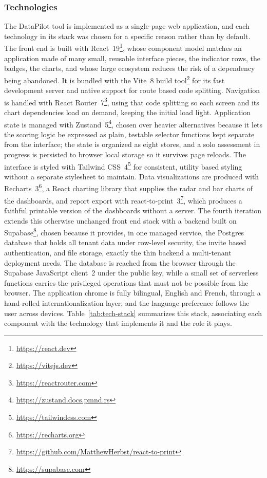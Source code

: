 \subsubsection{Technologies}

The DataPilot tool is implemented as a single-page web application, and each technology in its stack was chosen for a specific reason rather than by default. The front end is built with React~19\footnote{\url{https://react.dev}}, whose component model matches an application made of many small, reusable interface pieces, the indicator rows, the badges, the charts, and whose large ecosystem reduces the risk of a dependency being abandoned. It is bundled with the Vite~8 build tool\footnote{\url{https://vitejs.dev}} for its fast development server and native support for route based code splitting. Navigation is handled with React Router~7\footnote{\url{https://reactrouter.com}}, using that code splitting so each screen and its chart dependencies load on demand, keeping the initial load light. Application state is managed with Zustand~5\footnote{\url{https://zustand.docs.pmnd.rs}}, chosen over heavier alternatives because it lets the scoring logic be expressed as plain, testable selector functions kept separate from the interface; the state is organized as eight stores, and a solo assessment in progress is persisted to browser local storage so it survives page reloads. The interface is styled with Tailwind CSS~4\footnote{\url{https://tailwindcss.com}} for consistent, utility based styling without a separate stylesheet to maintain. Data visualizations are produced with Recharts~3\footnote{\url{https://recharts.org}}, a React charting library that supplies the radar and bar charts of the dashboards, and report export with react-to-print~3\footnote{\url{https://github.com/MatthewHerbst/react-to-print}}, which produces a faithful printable version of the dashboards without a server. The fourth iteration extends this otherwise unchanged front end stack with a backend built on Supabase\footnote{\url{https://supabase.com}}, chosen because it provides, in one managed service, the Postgres database that holds all tenant data under row-level security, the invite based authentication, and file storage, exactly the thin backend a multi-tenant deployment needs. The database is reached from the browser through the Supabase JavaScript client~2 under the public key, while a small set of serverless functions carries the privileged operations that must not be possible from the browser. The application chrome is fully bilingual, English and French, through a hand-rolled internationalization layer, and the language preference follows the user across devices. Table~\ref{tab:tech-stack} summarizes this stack, associating each component with the technology that implements it and the role it plays.

